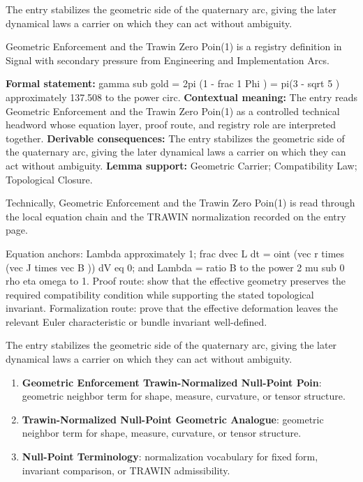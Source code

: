 The entry stabilizes the geometric side of the quaternary arc, giving the later dynamical laws a carrier on which they can act without ambiguity.
\clearpage


\begingroup\small
{}
Geometric Enforcement and the Trawin Zero Poin(1) is a registry definition in Signal with secondary pressure from Engineering and Implementation Arcs.

\begingroup\footnotesize\setlength{\emergencystretch}{3em}\sloppy
\textbf{Formal statement:} gamma sub gold = 2pi (1 - frac 1 Phi ) = pi(3 - sqrt 5 ) approximately 137.508 to the power circ. \textbf{Contextual meaning:} The entry reads Geometric Enforcement and the Trawin Zero Poin(1) as a controlled technical headword whose equation layer, proof route, and registry role are interpreted together. \textbf{Derivable consequences:} The entry stabilizes the geometric side of the quaternary arc, giving the later dynamical laws a carrier on which they can act without ambiguity. \textbf{Lemma support:} Geometric Carrier; Compatibility Law; Topological Closure.\par
\endgroup

Technically, Geometric Enforcement and the Trawin Zero Poin(1) is read through the local equation chain and the TRAWIN normalization recorded on the entry page.

Equation anchors: Lambda approximately 1; frac dvec L dt = oint (vec r times (vec J times vec B )) dV eq 0; and Lambda = ratio B to the power 2 mu sub 0 rho eta omega to 1. Proof route: show that the effective geometry preserves the required compatibility condition while supporting the stated topological invariant. Formalization route: prove that the effective deformation leaves the relevant Euler characteristic or bundle invariant well-defined.

The entry stabilizes the geometric side of the quaternary arc, giving the later dynamical laws a carrier on which they can act without ambiguity.
\endgroup

\begin{enumerate}[leftmargin=1.6em,itemsep=6pt,topsep=4pt]
\item \textbf{Geometric Enforcement Trawin-Normalized Null-Point Poin}: geometric neighbor term for shape, measure, curvature, or tensor structure.
\item \textbf{Trawin-Normalized Null-Point Geometric Analogue}: geometric neighbor term for shape, measure, curvature, or tensor structure.
\item \textbf{Null-Point Terminology}: normalization vocabulary for fixed form, invariant comparison, or TRAWIN admissibility.
\end{enumerate}

